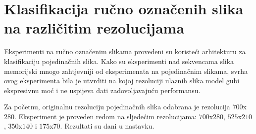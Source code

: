 \documentclass[times, utf8, diplomski, numeric]{fer}
\begin{document}
\section{Klasifikacija ručno označenih slika na različitim rezolucijama}
Eksperimenti na ručno označenim slikama provedeni su koristeći arhitekturu za klasifikaciju pojedinačnih slika. 
Kako su eksperimenti nad sekvencama slika memorijski mnogo zahtjevniji od eksperimenata na pojedinačnim slikama, svrha ovog eksperimenta bila je utvrditi
na kojoj rezoluciji ulaznih slika model gubi ekspresivnu moć i ne uspijeva dati zadovoljavajuću performansu.

Za početnu, originalnu rezoluciju pojedinačnih slika odabrana je rezolucija $700$x$280$. Eksperiment je proveden redom na sljedećim rezolucijama:
$700$x$280$, $525$x$210$, $350$x$140$ i $175$x$70$. Rezultati su dani u nastavku.
\end{document}
